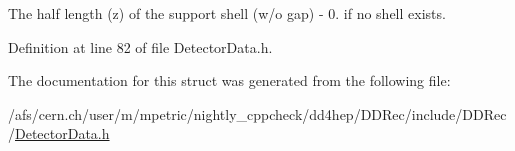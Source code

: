 The half length (z) of the support shell (w/o gap) -\/ 0. if no shell exists. 

Definition at line 82 of file DetectorData.h.

The documentation for this struct was generated from the following file:\begin{DoxyCompactItemize}
\item 
/afs/cern.ch/user/m/mpetric/nightly\_\-cppcheck/dd4hep/DDRec/include/DDRec/\hyperlink{_detector_data_8h}{DetectorData.h}\end{DoxyCompactItemize}
